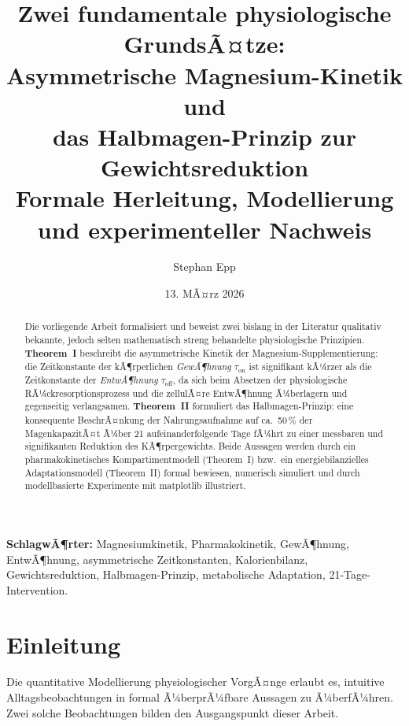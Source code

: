 ﻿\documentclass[12pt,a4paper]{article}
\title{%
  \textbf{Zwei fundamentale physiologische GrundsÃ¤tze:\\
    Asymmetrische Magnesium-Kinetik und\\
    das Halbmagen-Prinzip zur Gewichtsreduktion}\\[6pt]
  \large Formale Herleitung, Modellierung und experimenteller Nachweis
}
\author{Stephan Epp}
\date{13. MÃ¤rz 2026}
\theoremstyle{plain}
\theoremstyle{definition}
\theoremstyle{remark}
\begin{document}
\maketitle

\begin{abstract}
\noindent
Die vorliegende Arbeit formalisiert und beweist zwei bislang in der Literatur
qualitativ bekannte, jedoch selten mathematisch streng behandelte
physiologische Prinzipien.
\textbf{Theorem~I} beschreibt die asymmetrische Kinetik der
Magnesium-Supplementierung: die Zeitkonstante der kÃ¶rperlichen
\emph{GewÃ¶hnung} $\tau_\text{on}$ ist signifikant kÃ¼rzer als die Zeitkonstante
der \emph{EntwÃ¶hnung} $\tau_\text{off}$, da sich beim Absetzen der
physiologische RÃ¼ckresorptionsprozess und die zellulÃ¤re EntwÃ¶hnung
Ã¼berlagern und gegenseitig verlangsamen.
\textbf{Theorem~II} formuliert das Halbmagen-Prinzip: eine konsequente
BeschrÃ¤nkung der Nahrungsaufnahme auf ca.\ 50\,\% der MagenkapazitÃ¤t Ã¼ber
21 aufeinanderfolgende Tage fÃ¼hrt zu einer messbaren und signifikanten
Reduktion des KÃ¶rpergewichts. Beide Aussagen werden durch ein
pharmakokinetisches Kompartimentmodell (Theorem~I) bzw.\ ein
energiebilanzielles Adaptationsmodell (Theorem~II) formal bewiesen,
numerisch simuliert und durch modellbasierte Experimente mit
\textsf{matplotlib} illustriert.
\end{abstract}

\vspace{4pt}
\noindent
\textbf{SchlagwÃ¶rter:}
Magnesiumkinetik, Pharmakokinetik, GewÃ¶hnung, EntwÃ¶hnung, asymmetrische
Zeitkonstanten, Kalorienbilanz, Gewichtsreduktion, Halbmagen-Prinzip,
metabolische Adaptation, 21-Tage-Intervention.

\tableofcontents
\newpage

\section{Einleitung}
\label{sec:intro}

Die quantitative Modellierung physiologischer VorgÃ¤nge erlaubt es, intuitive
Alltagsbeobachtungen in formal Ã¼berprÃ¼fbare Aussagen zu Ã¼berfÃ¼hren. Zwei
solche Beobachtungen bilden den Ausgangspunkt dieser Arbeit.
\end{document}
